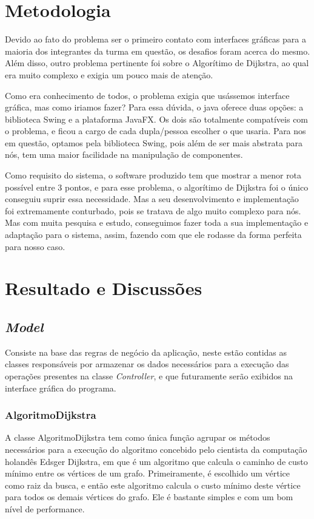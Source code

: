 \documentclass[12pt]{article}
\begin{document}
\section{Metodologia}
Devido ao fato do problema ser o primeiro contato com interfaces gráficas para a maioria dos integrantes da turma em questão, os desafios foram acerca do mesmo. Além disso, outro problema pertinente foi sobre o Algorítimo de Dijkstra, ao qual era muito complexo e exigia um pouco mais de atenção.

Como era conhecimento de todos, o problema exigia que usássemos interface gráfica, mas como iriamos fazer? Para essa dúvida, o java oferece duas opções: a biblioteca Swing e a plataforma JavaFX. Os dois são totalmente compatíveis com o problema, e ficou a cargo de cada dupla/pessoa escolher o que usaria. Para nos em questão, optamos pela biblioteca Swing, pois além de ser mais abstrata para nós, tem uma maior facilidade na manipulação de componentes.  

Como requisito do sistema, o software produzido tem que mostrar a menor rota possível entre 3 pontos, e para esse problema, o algorítimo de Dijkstra foi o único conseguiu suprir essa necessidade. Mas a seu desenvolvimento e implementação foi extremamente conturbado, pois se tratava de algo muito complexo para nós. Mas com muita pesquisa e estudo, conseguimos fazer toda a sua implementação e adaptação para o sistema, assim, fazendo com que ele rodasse da forma perfeita para nosso caso.
\section{Resultado e Discussões}

\subsection{{\itshape Model}}
Consiste na base das regras de negócio da aplicação, neste estão contidas as classes responsáveis por armazenar os dados necessários para a execução das operações presentes na classe {\itshape Controller}, e que futuramente serão exibidos na interface gráfica do programa.

\subsubsection{AlgoritmoDijkstra}
A classe AlgoritmoDijkstra tem como única função agrupar os métodos necessários para a execução do algoritmo  concebido pelo cientista da computação holandês Edsger Dijkstra, em que é um algoritmo que calcula o caminho de custo mínimo entre os vértices de um grafo. Primeiramente, é escolhido um vértice como raiz da busca, e então este algoritmo calcula o custo mínimo deste vértice para todos os demais vértices do grafo. Ele é bastante simples e com um bom nível de performance. \cite{algoritmoDijkstra}
\end{document}
